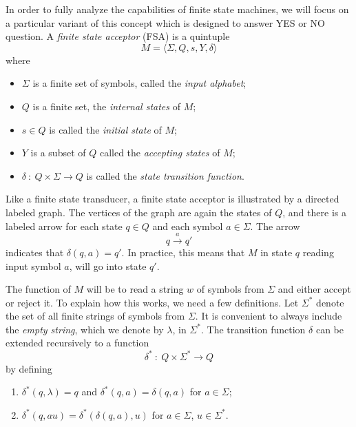 \documentclass{article}
\begin{document}
In order to fully analyze the capabilities of finite state machines, we will focus on a particular variant of this concept which is designed to answer YES or NO question. A \emph{finite state acceptor} (FSA) is a quintuple
\begin{equation*}
M = \langle \Sigma, Q, s, Y, \delta \rangle
\end{equation*}
where
\begin{itemize}
  \item $\Sigma$ is a finite set of symbols, called the \emph{input alphabet};
  \item $Q$ is a finite set, the \emph{internal states} of $M$;
  \item $s \in Q$ is called the \emph{initial state} of $M$;
  \item $Y$ is a subset of $Q$ called the \emph{accepting states} of $M$;
  \item $\delta\ :\ Q \times \Sigma \to Q$ is called the \emph{state transition function}.
\end{itemize}

Like a finite state transducer, a finite state acceptor is illustrated by a directed labeled graph. The vertices of the graph are again the states of $Q$, and there is a labeled arrow for each state $q \in Q$ and each symbol $a \in \Sigma$. The arrow
\begin{equation*}
q \overset{a}{\longrightarrow} q'
\end{equation*}
indicates that $\delta(q,a) = q'$. In practice, this means that $M$ in state $q$ reading input symbol $a$, will go into state $q'$.

The function of $M$ will be to read a string $w$ of symbols from $\Sigma$ and either accept or reject it. To explain how this works, we need a few definitions. Let $\Sigma^*$ denote the set of all finite strings of symbols from $\Sigma$. It is convenient to always include the \emph{empty string}, which we denote by $\lambda$, in $\Sigma^*$. The transition function $\delta$ can be extended recursively to a function
\begin{equation*}
\delta^*\ :\ Q \times \Sigma^* \to Q
\end{equation*}
by defining
\begin{enumerate}
  \item $\delta^*(q,\lambda) = q$ and $\delta^*(q,a) = \delta(q,a)$ for $a \in \Sigma$;
  \item $\delta^*(q,au) = \delta^*(\delta(q,a),u)$ for $a \in \Sigma$, $u \in \Sigma^*$.
\end{enumerate}
\end{document}
